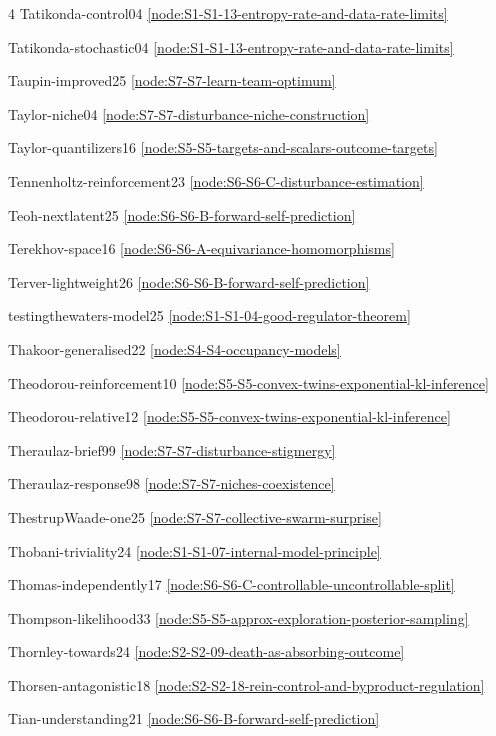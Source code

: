 \documentclass[10pt]{article}
\begin{document}
{\begin{multicols}{4}
Tatikonda-control04 \hfill \ref{node:S1-S1-13-entropy-rate-and-data-rate-limits}\par
Tatikonda-stochastic04 \hfill \ref{node:S1-S1-13-entropy-rate-and-data-rate-limits}\par
Taupin-improved25 \hfill \ref{node:S7-S7-learn-team-optimum}\par
Taylor-niche04 \hfill \ref{node:S7-S7-disturbance-niche-construction}\par
Taylor-quantilizers16 \hfill \ref{node:S5-S5-targets-and-scalars-outcome-targets}\par
Tennenholtz-reinforcement23 \hfill \ref{node:S6-S6-C-disturbance-estimation}\par
Teoh-nextlatent25 \hfill \ref{node:S6-S6-B-forward-self-prediction}\par
Terekhov-space16 \hfill \ref{node:S6-S6-A-equivariance-homomorphisms}\par
Terver-lightweight26 \hfill \ref{node:S6-S6-B-forward-self-prediction}\par
testingthewaters-model25 \hfill \ref{node:S1-S1-04-good-regulator-theorem}\par
Thakoor-generalised22 \hfill \ref{node:S4-S4-occupancy-models}\par
Theodorou-reinforcement10 \hfill \ref{node:S5-S5-convex-twins-exponential-kl-inference}\par
Theodorou-relative12 \hfill \ref{node:S5-S5-convex-twins-exponential-kl-inference}\par
Theraulaz-brief99 \hfill \ref{node:S7-S7-disturbance-stigmergy}\par
Theraulaz-response98 \hfill \ref{node:S7-S7-niches-coexistence}\par
ThestrupWaade-one25 \hfill \ref{node:S7-S7-collective-swarm-surprise}\par
Thobani-triviality24 \hfill \ref{node:S1-S1-07-internal-model-principle}\par
Thomas-independently17 \hfill \ref{node:S6-S6-C-controllable-uncontrollable-split}\par
Thompson-likelihood33 \hfill \ref{node:S5-S5-approx-exploration-posterior-sampling}\par
Thornley-towards24 \hfill \ref{node:S2-S2-09-death-as-absorbing-outcome}\par
Thorsen-antagonistic18 \hfill \ref{node:S2-S2-18-rein-control-and-byproduct-regulation}\par
Tian-understanding21 \hfill \ref{node:S6-S6-B-forward-self-prediction}\par

\end{multicols}}
\end{document}
